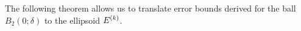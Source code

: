 % 
% 
% 
% 
% 
% 
% 
% 
% 
% 
% 
% 
% 

The following theorem allows us to translate error bounds derived for the ball $B_2(0;\delta)$ to the ellipsoid ${E^{(k)}}$.




